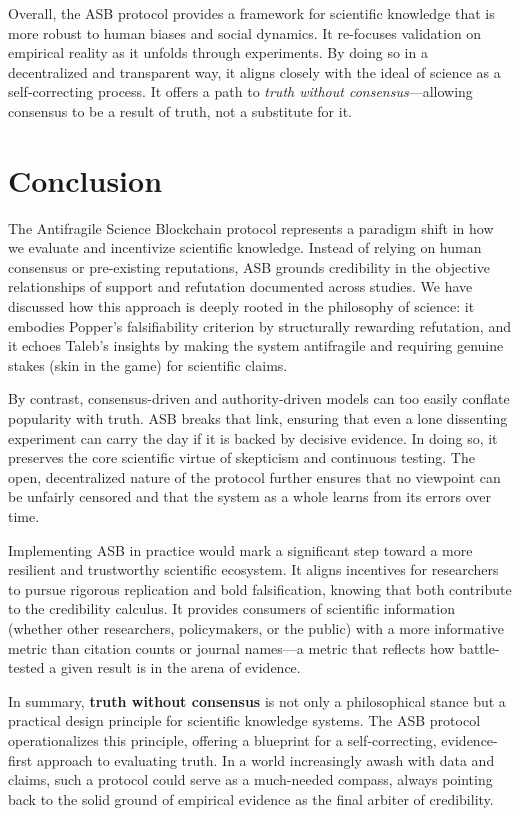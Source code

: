 \documentclass{article}
\begin{document}
Overall, the ASB protocol provides a framework for scientific knowledge that is more robust to human biases and social dynamics. It re-focuses validation on empirical reality as it unfolds through experiments. By doing so in a decentralized and transparent way, it aligns closely with the ideal of science as a self-correcting process. It offers a path to \emph{truth without consensus}—allowing consensus to be a result of truth, not a substitute for it.


\section{Conclusion}
The Antifragile Science Blockchain protocol represents a paradigm shift in how we evaluate and incentivize scientific knowledge. Instead of relying on human consensus or pre-existing reputations, ASB grounds credibility in the objective relationships of support and refutation documented across studies. We have discussed how this approach is deeply rooted in the philosophy of science: it embodies Popper's falsifiability criterion by structurally rewarding refutation, and it echoes Taleb's insights by making the system antifragile and requiring genuine stakes (skin in the game) for scientific claims. 

By contrast, consensus-driven and authority-driven models can too easily conflate popularity with truth. ASB breaks that link, ensuring that even a lone dissenting experiment can carry the day if it is backed by decisive evidence. In doing so, it preserves the core scientific virtue of skepticism and continuous testing. The open, decentralized nature of the protocol further ensures that no viewpoint can be unfairly censored and that the system as a whole learns from its errors over time.

Implementing ASB in practice would mark a significant step toward a more resilient and trustworthy scientific ecosystem. It aligns incentives for researchers to pursue rigorous replication and bold falsification, knowing that both contribute to the credibility calculus. It provides consumers of scientific information (whether other researchers, policymakers, or the public) with a more informative metric than citation counts or journal names—a metric that reflects how battle-tested a given result is in the arena of evidence.

In summary, \textbf{truth without consensus} is not only a philosophical stance but a practical design principle for scientific knowledge systems. The ASB protocol operationalizes this principle, offering a blueprint for a self-correcting, evidence-first approach to evaluating truth. In a world increasingly awash with data and claims, such a protocol could serve as a much-needed compass, always pointing back to the solid ground of empirical evidence as the final arbiter of credibility.




\end{document}
